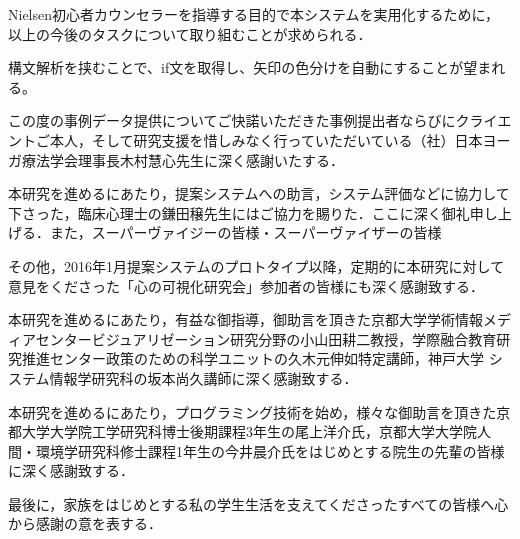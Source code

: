 \documentclass[shuuron]{kuee}
\begin{document}
Nielsen初心者カウンセラーを指導する目的で本システムを実用化するために，以上の今後のタスクについて取り組むことが求められる．%


構文解析を挟むことで、if文を取得し、矢印の色分けを自動にすることが望まれる。



\begin{acknowledgements}
  この度の事例データ提供についてご快諾いただきた事例提出者ならびにクライエントご本人，そして研究支援を惜しみなく行っていただいている（社）日本ヨーガ療法学会理事長木村慧心先生に深く感謝いたする．

本研究を進めるにあたり，提案システムへの助言，システム評価などに協力して下さった，臨床心理士の鎌田穣先生にはご協力を賜りた．ここに深く御礼申し上げる．また，スーパーヴァイジーの皆様・スーパーヴァイザーの皆様

その他，2016年1月提案システムのプロトタイプ以降，定期的に本研究に対して意見をくださった「心の可視化研究会」参加者の皆様にも深く感謝致する．

本研究を進めるにあたり，有益な御指導，御助言を頂きた京都大学学術情報メディアセンタービジュアリゼーション研究分野の小山田耕二教授，学際融合教育研究推進センター政策のための科学ユニットの久木元伸如特定講師，神戸大学 システム情報学研究科の坂本尚久講師に深く感謝致する．



本研究を進めるにあたり，プログラミング技術を始め，様々な御助言を頂きた京都大学大学院工学研究科博士後期課程3年生の尾上洋介氏，京都大学大学院人間・環境学研究科修士課程1年生の今井晨介氏をはじめとする院生の先輩の皆様に深く感謝致する．

最後に，家族をはじめとする私の学生生活を支えてくださったすべての皆様へ心から感謝の意を表する．
\end{acknowledgements}





\end{document}
